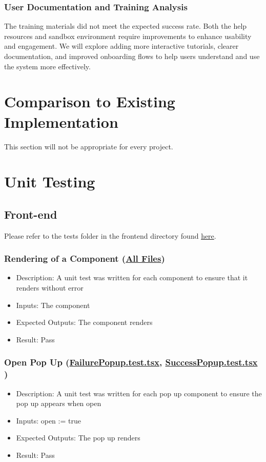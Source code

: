 \documentclass[12pt, titlepage]{article}
\begin{document}
\subsubsection{User Documentation and Training Analysis}
The training materials did not meet the expected success rate. Both the help resources and sandbox environment require improvements to enhance usability and engagement. We will explore adding more interactive tutorials, clearer documentation, and improved onboarding flows to help users understand and use the system more effectively.


	
\section{Comparison to Existing Implementation}	

This section will not be appropriate for every project.

\section{Unit Testing}
\subsection{Front-end}
Please refer to the tests folder in the frontend directory found \href{https://github.com/OKKM-insights/frontend/tree/main/tests/__tests__}{here}.
\subsubsection{Rendering of a Component (\href{https://github.com/OKKM-insights/frontend/tree/main/tests/__tests__}{All Files})}
\begin{itemize}
    \item Description: A unit test was written for each component to ensure that it renders without error
    \item Inputs: The component
    \item Expected Outputs: The component renders 
    \item Result: Pass
\end{itemize}
\subsubsection{Open Pop Up (\href{https://github.com/OKKM-insights/frontend/blob/main/tests/__tests__/FailurePopup.test.tsx}{FailurePopup.test.tsx}, \href{https://github.com/OKKM-insights/frontend/blob/main/tests/__tests__/SuccessPopup.test.tsx}{SuccessPopup.test.tsx} )}
\begin{itemize}
    \item Description: A unit test was written for each pop up component to ensure the pop up appears when open
    \item Inputs: open := true
    \item Expected Outputs: The pop up renders 
    \item Result: Pass
\end{itemize}
\end{document}
